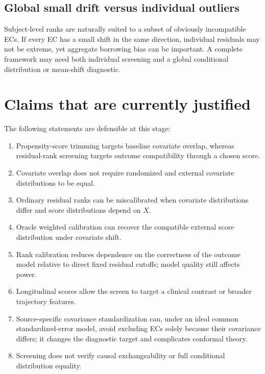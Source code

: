 \documentclass[11pt]{article}
\begin{document}
\subsection{Global small drift versus individual outliers}

Subject-level ranks are naturally suited to a subset of obviously incompatible ECs. If every EC has a small shift in the same direction, individual residuals may not be extreme, yet aggregate borrowing bias can be important. A complete framework may need both individual screening and a global conditional distribution or mean-shift diagnostic.

\section{Claims that are currently justified}

The following statements are defensible at this stage:
\begin{enumerate}
    \item Propensity-score trimming targets baseline covariate overlap, whereas residual-rank screening targets outcome compatibility through a chosen score.
    \item Covariate overlap does not require randomized and external covariate distributions to be equal.
    \item Ordinary residual ranks can be miscalibrated when covariate distributions differ and score distributions depend on $X$.
    \item Oracle weighted calibration can recover the compatible external score distribution under covariate shift.
    \item Rank calibration reduces dependence on the correctness of the outcome model relative to direct fixed residual cutoffs; model quality still affects power.
    \item Longitudinal scores allow the screen to target a clinical contrast or broader trajectory features.
    \item Source-specific covariance standardization can, under an ideal common standardized-error model, avoid excluding ECs solely because their covariance differs; it changes the diagnostic target and complicates conformal theory.
    \item Screening does not verify causal exchangeability or full conditional distribution equality.
\end{enumerate}
\end{document}
